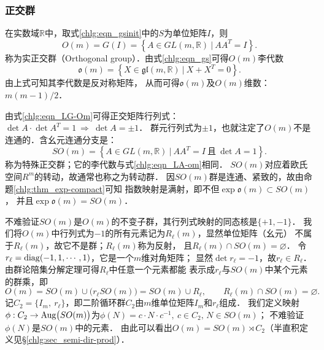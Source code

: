 

\subsubsection{正交群}\label{chlg:sec_Orthogonal}
在实数域$\mathbb{R}$中，取式\eqref{chlg:eqn_gsinit}中的$S$为单位矩阵$I$，则
\begin{equation}\label{chlg:eqn_LG-Om}
    O(m) = G(I)= \left\{ A \in GL(m,\mathbb{R})\ |\ A A^T =I \right\}.
\end{equation}
称为实{\heiti 正交群}（Orthogonal group）．由式\eqref{chlg:eqn_gs}可得$O(m)$李代数
\begin{equation}\label{chlg:eqn_LA-om}
    \mathfrak{o}(m) = \left\{ X \in \mathfrak{gl}(m,\mathbb{R}) \ | \ 
    X  +  X^T = 0 \right\} .
\end{equation}
由上式可知其李代数是反对称矩阵，
从而可得$\mathfrak{o}(m)$及$O(m)$维数：$m(m-1)/2$．

由式\eqref{chlg:eqn_LG-Om}可得正交矩阵行列式：
$\det A \cdot \det A^T = 1 \ \Rightarrow \ \det A = \pm 1$．
群元行列式为$\pm 1$，也就注定了$O(m)$不是连通的．含幺元连通分支是：
\begin{equation}\label{chlg:eqn_LG-so}
    SO(m) %
    = \left\{ A \in GL(m,\mathbb{R})\ |\ A A^T =I 
    \ \text{且}\ \det A = 1 \right\} .
\end{equation}
称为{\heiti 特殊正交群}；它的李代数与式\eqref{chlg:eqn_LA-om}相同．
$SO(m)$对应着欧氏空间$R^m$的转动，故通常也称之为{\heiti 转动群}．
因$SO(m)$群是连通、紧致的，故由命题\ref{chlg:thm_exp-compact}可知
指数映射是满射，即不但$\exp \mathfrak{o}(m) \subset SO(m)$，
并且$\exp \mathfrak{o}(m) = SO(m)$．






不难验证$SO(m)$是$O(m)$的不变子群，其行列式映射的同态核是$\{+1,-1\}$．
我们将$O(m)$中行列式为$-1$的所有元素记为$R_{\ell}(m)$，显然单位矩阵（幺元）
不属于$R_{\ell}(m)$，故它不是群；$R_{\ell}(m)$称为{\heiti 反射}，
且$R_{\ell}(m)\cap SO(m)=\varnothing$．
令$r_{\ell}={\rm diag}(-1,1,\cdots,1)$，它是一个$m$维对角矩阵；
显然$\det r_{\ell} = -1$，故$r_{\ell}\in R_{\ell}$．
由群论陪集分解定理可得$R_{\ell}$中任意一个元素都能
表示成$r_{\ell}$与$SO(m)$中某个元素的群乘，即
\begin{equation*}
    O(m)= SO(m)\cup \bigl(r_{\ell}SO(m)\bigr)= SO(m) \cup R_{\ell},
    \qquad R_{\ell}(m)\cap SO(m)=\varnothing . 
\end{equation*}
记$C_2=\{I_m,\ r_{\ell}\}$，即二阶循环群$C_2$由$m$维单位矩阵$I_m$和$r_{\ell}$组成．
我们定义映射$\phi:C_2 \to {\rm Aug}\bigl(SO(m)\bigr)$为$\phi(N)=c\cdot N \cdot c^{-1},
\  c\in C_2, \, N\in SO(m)$；
不难验证$\phi(N)$是$SO(m)$中的元素．
由此可以看出$O(m)=SO(m)\rtimes C_2$（半直积定义见\S\ref{chlg:sec_semi-dir-prod}）．


